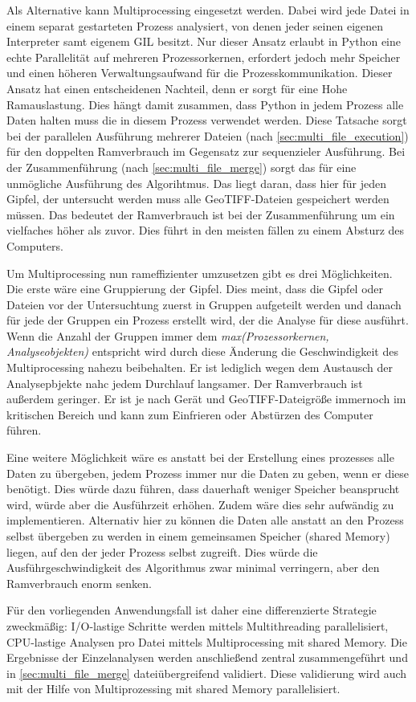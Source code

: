 Als Alternative kann Multiprocessing eingesetzt werden. Dabei wird jede Datei in einem separat gestarteten Prozess analysiert, von denen jeder seinen eigenen Interpreter samt eigenem GIL besitzt. Nur dieser Ansatz erlaubt in Python eine echte Parallelität auf mehreren Prozessorkernen, erfordert jedoch mehr Speicher und einen höheren Verwaltungsaufwand für die Prozesskommunikation. Dieser Ansatz hat einen entscheidenen Nachteil, denn er sorgt für eine Hohe Ramauslastung. Dies hängt damit zusammen, dass Python in jedem Prozess alle Daten halten muss die in diesem Prozess verwendet werden. Diese Tatsache sorgt bei der parallelen Ausführung mehrerer Dateien (nach \ref{sec:multi_file_execution}) für den doppelten Ramverbrauch im Gegensatz zur sequenzieler Ausführung. Bei der Zusammenführung (nach \ref{sec:multi_file_merge}) sorgt das für eine unmögliche Ausführung des Algorihtmus. Das liegt daran, dass hier für jeden Gipfel, der untersucht werden muss alle GeoTIFF-Dateien gespeichert werden müssen. Das bedeutet der Ramverbrauch ist bei der Zusammenführung um ein vielfaches höher als zuvor. Dies führt in den meisten fällen zu einem Absturz des Computers.

Um Multiprocessing nun rameffizienter umzusetzen gibt es drei Möglichkeiten. Die erste wäre eine Gruppierung der Gipfel. Dies meint, dass die Gipfel oder Dateien vor der Untersuchtung zuerst in Gruppen aufgeteilt werden und danach für jede der Gruppen ein Prozess erstellt wird, der die Analyse für diese ausführt. Wenn die Anzahl der Gruppen immer dem \textit{max(Prozessorkernen, Analyseobjekten)} entspricht wird durch diese Änderung die Geschwindigkeit des Multiprocessing nahezu beibehalten. Er ist lediglich wegen dem Austausch der Analysepbjekte nahc jedem Durchlauf langsamer. Der Ramverbrauch ist außerdem geringer. Er ist je nach Gerät und GeoTIFF-Dateigröße immernoch im kritischen Bereich und kann zum Einfrieren oder Abstürzen des Computer führen. 

Eine weitere Möglichkeit wäre es anstatt bei der Erstellung eines prozesses alle Daten zu übergeben, jedem Prozess immer nur die Daten zu geben, wenn er diese benötigt. Dies würde dazu führen, dass dauerhaft weniger Speicher beansprucht wird, würde aber die Ausführzeit erhöhen. Zudem wäre dies sehr aufwändig zu implementieren. Alternativ hier zu können die Daten alle anstatt an den Prozess selbst übergeben zu werden in einem gemeinsamen Speicher (shared Memory) liegen, auf den der jeder Prozess selbst zugreift. Dies würde die Ausführgeschwindigkeit des Algorithmus zwar minimal verringern, aber den Ramverbrauch enorm senken.

Für den vorliegenden Anwendungsfall ist daher eine differenzierte Strategie zweckmäßig: I/O-lastige Schritte werden mittels Multithreading parallelisiert, CPU-lastige Analysen pro Datei mittels Multiprocessing mit shared Memory. Die Ergebnisse der Einzelanalysen werden anschließend zentral zusammengeführt und in \ref{sec:multi_file_merge} dateiübergreifend validiert. Diese validierung wird auch mit der Hilfe von Multiprozessing mit shared Memory parallelisiert.